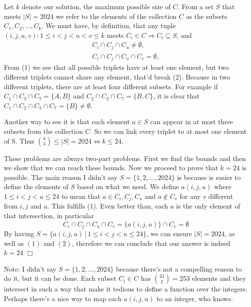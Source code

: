 \begin{solution}[24]
    Let $k$ denote our solution, the maximum possible size of $C$. From a set $S$ that meets $|S| = 2024$ we refer to the elements of the collection $C$ as the subsets $C_1, C_2, \ldots, C_k$. We must have, by definition, that any tuple $(i,j,u,v): 1\leq i<j<u<v \leq k$ meets 
    $C_i \in C \Rightarrow C_i \subseteq S$, and 
    \begin{align}
         C_i \cap C_j \cap C_u \neq \emptyset, \\ 
        C_i \cap C_j \cap C_u \cap C_v = \emptyset,
    \end{align}
    From (1) we see that all possible triplets have at least one element, but two different triplets cannot share any element, that'd break (2). Because in two different triplets, there are at least four different subsets. For example if $C_1 \cap C_3 \cap C_7 = \{ A, B \}$ and $C_2 \cap C_3 \cap C_7 = \{B,C\}$, it is clear that $C_1 \cap C_2 \cap C_3 \cap C_7 = \{B \} \neq \emptyset$.
    
    Another way to see it is that each element $a \in S$ can appear in at most three subsets from the collection $C$. So we can link every triplet to at most one element of S. Thus $\binom{k}{3} \leq |S|=2024 \iff k \leq 24$.

    These problems are always two-part problems. First we find the bounds and then we show that we can reach these bounds. Now we proceed to prove that $k=24$ is possible. The main reason I didn't say $S = \{1,2, \ldots, 2024\}$ is because is easier to define the elements of $S$ based on what we need. We define $a(i,j,u)$ where $1 \leq i<j<u \leq 24$ to mean that $a \in C_i , C_j, C_u$ and $a \notin C_v$ for any $v$ different from $i,j$ and $u$. This fulfills (1). Even better than, each $a$ is the only element of that intersection, in particular
    $$  C_i \cap C_j \cap C_u \cap C_v = \{a(i,j,u)\} \cap C_v = \emptyset$$
    By having $S = \{a(i,j,u) \, | \, 1 \leq i<j<u \leq 24 \}$, we can ensure $|S| = 2024$, as well as $(1)$ and $(2)$, therefore we can conclude that our answer is indeed $k=24$ $\Box$

    Note: I didn't say $S = \{1,2,\ldots,2024\}$ because there's not a compelling reason to do it, but it can be done. Each subset $C_i \in C$ has $\binom{23}{2}=253$ elements and they intersect in such a way that make it tedious to define a function over the integers. Perhaps there's a nice way to map each $a(i,j,u)$ to an integer, who knows.
\end{solution}

